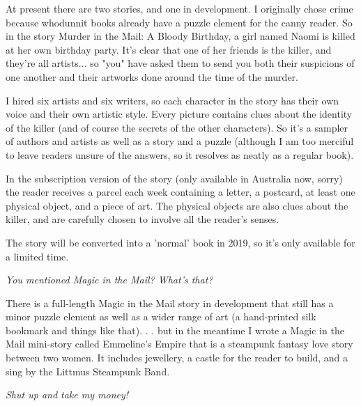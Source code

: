 \medskip
At present there are two stories, and one in development. I originally chose crime because whodunnit books already have a puzzle element for the canny reader. So in the story Murder in the Mail: A Bloody Birthday, a girl named Naomi is killed at her own birthday party. It's clear that one of her friends is the killer, and they're all artists... so "you" have asked them to send you both their suspicions of one another and their artworks done around the time of the murder.

I hired six artists and six writers, so each character in the story has their own voice and their own artistic style. Every picture contains clues about the identity of the killer (and of course the secrets of the other characters). So it's a sampler of authors and artists as well as a story and a puzzle (although I am too merciful to leave readers unsure of the answers, so it resolves as neatly as a regular book).

In the subscription version of the story (only available in Australia now, sorry) the reader receives a parcel each week containing a letter, a postcard, at least one physical object, and a piece of art. The physical objects are also clues about the killer, and are carefully chosen to involve all the reader's senses.

The story will be converted into a 'normal' book in 2019, so it's only available for a limited time.

\medskip
\emph{You mentioned Magic in the Mail? What's that?}

\medskip
There is a full-length Magic in the Mail story in development that still has a minor puzzle element as well as a wider range of art (a hand-printed silk bookmark and things like that). . . but in the meantime I wrote a Magic in the Mail mini-story called Emmeline's Empire that is a steampunk fantasy love story between two women. It includes jewellery, a castle for the reader to build, and a sing by the Littmus Steampunk Band.

\medskip
\emph{Shut up and take my money!}

